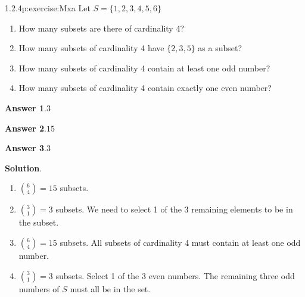 \documentclass[twoside,11pt,]{book}
\newcommand{\blocktitlefont}{\relax}
\numberwithin{equation}{chapter}
\begin{document}
\begin{divisionsolution}{1.2.4}{}{p:exercise:Mxa}%
Let \(S = \{1, 2, 3, 4, 5, 6\}\)%
\begin{enumerate}[label=(\alph*)]
\item{}How many subsets are there of cardinality 4?%
\item{}How many subsets of cardinality 4 have \(\{2,3,5\}\) as a subset?%
\item{}How many subsets of cardinality 4 contain at least one odd number?%
\item{}How many subsets of cardinality 4 contain exactly one even number?%
\end{enumerate}
%
\par\smallskip%
\noindent\textbf{\blocktitlefont Answer 1}.\quad{}\(3\)%
\par\smallskip%
\noindent\textbf{\blocktitlefont Answer 2}.\quad{}\(15\)%
\par\smallskip%
\noindent\textbf{\blocktitlefont Answer 3}.\quad{}\(3\)%
\par\smallskip%
\noindent\textbf{\blocktitlefont Solution}.\quad{}%
\begin{enumerate}[label=(\alph*)]
\item{}\({6\choose 4} = 15\) subsets.%
\item{}\({3 \choose 1} = 3\) subsets. We need to select 1 of the 3 remaining elements to be in the subset.%
\item{}\({6 \choose 4} = 15\) subsets. All subsets of cardinality 4 must contain at least one odd number.%
\item{}\({3 \choose 1} = 3\) subsets. Select 1 of the 3 even numbers. The remaining three odd numbers of \(S\) must all be in the set.%
\end{enumerate}
%
\end{divisionsolution}%
\end{document}
